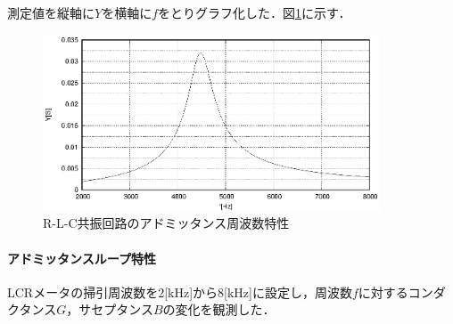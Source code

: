\documentclass[dvipdfmx,titlepage,a4j]{jsarticle}  %
\numberwithin{equation}{section}
\begin{document}
測定値を縦軸に$Y$を横軸に$f$をとりグラフ化した．図\ref{fig:A_YTheta.eps}に示す．
\begin{figure}[H]
  \centering
  \includegraphics[width=10cm]{../gnuplot/A_YTheta.eps}
  \caption{R-L-C共振回路のアドミッタンス周波数特性}
  \label{fig:A_YTheta.eps}
\end{figure}

\paragraph{アドミッタンスループ特性}
LCRメータの掃引周波数を2[kHz]から8[kHz]に設定し，周波数$f$に対するコンダクタンス$G$，サセプタンス$B$の変化を観測した．
\end{document}
